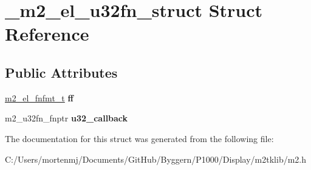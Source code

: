 \hypertarget{struct__m2__el__u32fn__struct}{\section{\-\_\-m2\-\_\-el\-\_\-u32fn\-\_\-struct Struct Reference}
\label{struct__m2__el__u32fn__struct}
}
\subsection*{Public Attributes}
\begin{DoxyCompactItemize}
\item 
\hypertarget{struct__m2__el__u32fn__struct_a1c6ba0b42a0a397a119ab4aac7c4aca4}{\hyperlink{struct__m2__el__fnfmt__struct}{m2\-\_\-el\-\_\-fnfmt\-\_\-t} {\bfseries ff}}\label{struct__m2__el__u32fn__struct_a1c6ba0b42a0a397a119ab4aac7c4aca4}

\item 
\hypertarget{struct__m2__el__u32fn__struct_a7b21b361ae57361317aac3ed89cc2c59}{m2\-\_\-u32fn\-\_\-fnptr {\bfseries u32\-\_\-callback}}\label{struct__m2__el__u32fn__struct_a7b21b361ae57361317aac3ed89cc2c59}

\end{DoxyCompactItemize}


The documentation for this struct was generated from the following file\-:\begin{DoxyCompactItemize}
\item 
C\-:/\-Users/mortenmj/\-Documents/\-Git\-Hub/\-Byggern/\-P1000/\-Display/m2tklib/m2.\-h\end{DoxyCompactItemize}
